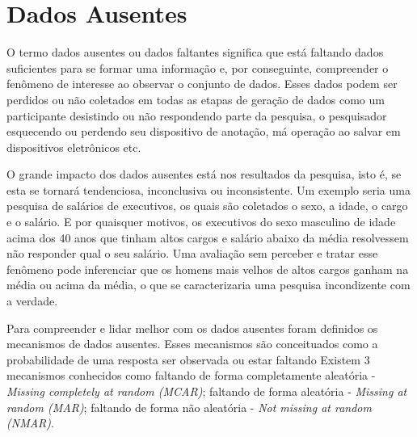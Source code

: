 \documentclass[
	12pt,				%
	openright,			%
	twoside,			%
	a4paper,			%
	english,			%
	brazil				%
	]{abntex2}
\begin{document}
	\section{Dados Ausentes}
		O termo dados ausentes ou dados faltantes significa que está faltando dados suficientes para se formar uma informação e,
		por conseguinte, compreender o fenômeno de interesse ao observar o conjunto de dados. \cite{patrickmcknight2007}
		Esses dados podem ser perdidos ou não coletados em todas as etapas de geração de dados
		como um participante desistindo ou não respondendo parte da pesquisa,
		o pesquisador esquecendo ou perdendo seu dispositivo de anotação,
		má operação ao salvar em dispositivos eletrônicos etc. \cite{patrickmcknight2007}
		\par

		O grande impacto dos dados ausentes está nos resultados da pesquisa,
		isto é, se esta se tornará tendenciosa, inconclusiva ou inconsistente. \cite{patrickmcknight2007}
		Um exemplo seria uma pesquisa de salários de executivos, os quais são coletados o sexo, a idade, o cargo e o salário.
		E por quaisquer motivos, os executivos do sexo masculino de idade acima dos 40 anos que tinham altos cargos e salário abaixo da média resolvessem não responder qual o seu salário.
		Uma avaliação sem perceber e tratar esse fenômeno pode inferenciar que os homens mais velhos de altos cargos ganham na média ou acima da média, o que se caracterizaria uma pesquisa incondizente com a verdade.
		\par

		Para compreender e lidar melhor com os dados ausentes foram definidos os mecanismos de dados ausentes.
		Esses mecanismos são conceituados como a probabilidade de uma resposta ser observada ou estar faltando \cite{hbmissingdatameth2014}
		Existem 3 mecanismos conhecidos como 
		faltando de forma completamente aleatória - \emph{Missing completely at random (MCAR)};
		faltando de forma aleatória - \emph{Missing at random (MAR)};
		faltando de forma não aleatória - \emph{Not missing at random (NMAR)}. \cite{hbmissingdatameth2014}
\end{document}
